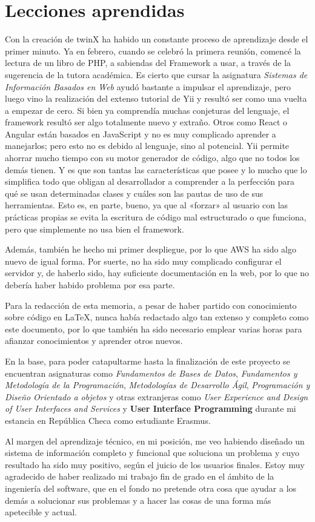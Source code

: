 \section{Lecciones aprendidas}

Con la creación de twinX ha habido un constante proceso de aprendizaje desde el primer minuto. Ya en febrero, cuando se celebró la primera reunión, comencé la lectura de un libro de PHP, a sabiendas del Framework a usar, a través de la sugerencia de la tutora académica. Es cierto que cursar la asignatura \textit{Sistemas de Información Basados en Web} ayudó bastante a impulsar el aprendizaje, pero luego vino la realización del extenso tutorial de Yii y resultó ser como una vuelta a empezar de cero. Si bien ya comprendía muchas conjeturas del lenguaje, el framework resultó ser algo totalmente nuevo y extraño. Otros como React o Angular están basados en JavaScript y no es muy complicado aprender a manejarlos; pero esto no es debido al lenguaje, sino al potencial. Yii permite ahorrar mucho tiempo con su motor generador de código, algo que no todos los demás tienen. Y es que son tantas las características que posee y lo mucho que lo simplifica todo que obligan al desarrollador a comprender a la perfección para qué se usan determinadas clases y cuáles son las pautas de uso de sus herramientas. Esto es, en parte, bueno, ya que al «forzar» al usuario con las prácticas propias se evita la escritura de código mal estructurado o que funciona, pero que simplemente no usa bien el framework.

Además, también he hecho mi primer despliegue, por lo que AWS ha sido algo nuevo de igual forma. Por suerte, no ha sido muy complicado configurar el servidor y, de haberlo sido, hay suficiente documentación en la web, por lo que no debería haber habido problema por esa parte.

Para la redacción de esta memoria, a pesar de haber partido con conocimiento sobre código en \LaTeX, nunca había redactado algo tan extenso y completo como este documento, por lo que también ha sido necesario emplear varias horas para afianzar conocimientos y aprender otros nuevos.

En la base, para poder catapultarme hasta la finalización de este proyecto se encuentran asignaturas como \textit{Fundamentos de Bases de Datos}, \textit{Fundamentos y Metodología de la Programación}, \textit{Metodologías de Desarrollo Ágil}, \textit{Programación y Diseño Orientado a objetos} y otras extranjeras como \textit{User Experience and Design of User Interfaces and Services} y \textbf{User Interface Programming} durante mi estancia en República Checa como estudiante Erasmus.

Al margen del aprendizaje técnico, en mi posición, me veo habiendo diseñado un sistema de información completo y funcional que soluciona un problema y cuyo resultado ha sido muy positivo, según el juicio de los usuarios finales. Estoy muy agradecido de haber realizado mi trabajo fin de grado en el ámbito de la ingeniería del software, que en el fondo no pretende otra cosa que ayudar a los demás a solucionar sus problemas y a hacer las cosas de una forma más apetecible y actual.